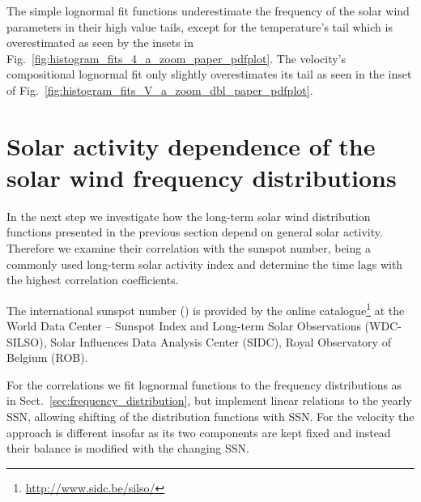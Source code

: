 The simple lognormal fit functions underestimate the frequency of the solar wind parameters in their high value tails, except for the temperature’s tail which is overestimated as seen by the insets in Fig.~\ref{fig:histogram_fits_4_a_zoom_paper_pdfplot}. The velocity's compositional lognormal fit only slightly overestimates its tail as seen in the inset of Fig.~\ref{fig:histogram_fits_V_a_zoom_dbl_paper_pdfplot}.


\section{Solar activity dependence of the solar wind frequency distributions}
\label{sec:solar_activity_variations}

In the next step we investigate how the long-term solar wind distribution functions presented in the previous section depend on general solar activity. Therefore we examine their correlation with the sunspot number, being a commonly used long-term solar activity index and determine the time lags with the highest correlation coefficients.

The international sunspot number (\citeyear{sidc}) is provided by the online catalogue\footnote{\url{http://www.sidc.be/silso/}} at the World Data Center -- Sunspot Index and Long-term Solar Observations (WDC-SILSO), Solar Influences Data Analysis Center (SIDC), Royal Observatory of Belgium (ROB).

For the correlations we fit lognormal functions to the frequency distributions as in Sect.~\ref{sec:frequency_distribution}, but implement linear relations to the yearly SSN, allowing shifting of the distribution functions with SSN. For the velocity the approach is different insofar as its two components are kept fixed and instead their balance is modified with the changing SSN.

